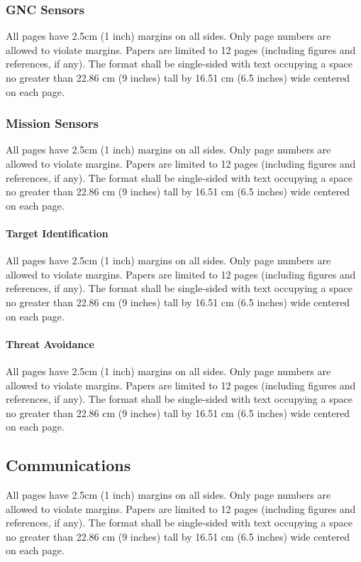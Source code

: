 \documentclass[12pt, letterpaper]{article}
\begin{document}
\subsubsection{GNC Sensors}
All pages have 2.5cm (1 inch) margins on all sides. Only page numbers are allowed to violate margins. Papers are limited to 12 pages (including figures and references, if any). The format shall be single-sided with text occupying a space no greater than 22.86 cm (9 inches) tall by 16.51 cm (6.5 inches) wide centered on each page.

\subsubsection{Mission Sensors}
All pages have 2.5cm (1 inch) margins on all sides. Only page numbers are allowed to violate margins. Papers are limited to 12 pages (including figures and references, if any). The format shall be single-sided with text occupying a space no greater than 22.86 cm (9 inches) tall by 16.51 cm (6.5 inches) wide centered on each page.

\paragraph{Target Identification}
All pages have 2.5cm (1 inch) margins on all sides. Only page numbers are allowed to violate margins. Papers are limited to 12 pages (including figures and references, if any). The format shall be single-sided with text occupying a space no greater than 22.86 cm (9 inches) tall by 16.51 cm (6.5 inches) wide centered on each page.

\paragraph{Threat Avoidance}
All pages have 2.5cm (1 inch) margins on all sides. Only page numbers are allowed to violate margins. Papers are limited to 12 pages (including figures and references, if any). The format shall be single-sided with text occupying a space no greater than 22.86 cm (9 inches) tall by 16.51 cm (6.5 inches) wide centered on each page.

\subsection{Communications}
All pages have 2.5cm (1 inch) margins on all sides. Only page numbers are allowed to violate margins. Papers are limited to 12 pages (including figures and references, if any). The format shall be single-sided with text occupying a space no greater than 22.86 cm (9 inches) tall by 16.51 cm (6.5 inches) wide centered on each page.
\end{document}
